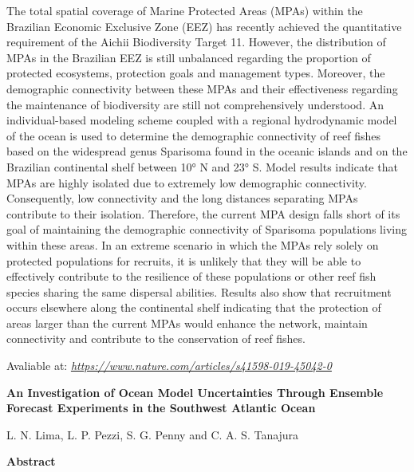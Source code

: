  The total spatial coverage of Marine Protected Areas (MPAs) within the Brazilian Economic Exclusive Zone (EEZ) has recently achieved the quantitative requirement of the Aichii 
          Biodiversity Target 11. However, the distribution of MPAs in the Brazilian EEZ is still unbalanced regarding the proportion of protected ecosystems, protection goals and management types. 
          Moreover, the demographic connectivity between these MPAs and their effectiveness regarding the maintenance of biodiversity are still not comprehensively understood. An individual-based
          modeling scheme coupled with a regional hydrodynamic model of the ocean is used to determine the demographic connectivity of reef fishes based on the widespread genus Sparisoma found in 
          the oceanic islands and on the Brazilian continental shelf between 10° N and 23° S. Model results indicate that MPAs are highly isolated due to extremely low demographic connectivity. 
          Consequently, low connectivity and the long distances separating MPAs contribute to their isolation. Therefore, the current MPA design falls short of its goal of maintaining the demographic
          connectivity of Sparisoma populations living within these areas. In an extreme scenario in which the MPAs rely solely on protected populations for recruits, it is unlikely that they will be 
          able to effectively contribute to the resilience of these populations or other reef fish species sharing the same dispersal abilities. Results also show that recruitment occurs elsewhere 
          along the continental shelf indicating that the protection of areas larger than the current MPAs would enhance the network, maintain connectivity and contribute to the conservation of reef fishes.
\bigskip

 \textcolor{black}{}
\bigskip

 Avaliable at: \textcolor{bleu_cite}{\href{https://www.nature.com/articles/s41598-019-45042-0}{\textit{https://www.nature.com/articles/s41598-019-45042-0}}}
\bigskip


\newpage
 \begin{center}
\textbf{An Investigation of Ocean Model Uncertainties Through Ensemble Forecast Experiments in the Southwest Atlantic Ocean}
\bigskip

 L. N. Lima, L. P. Pezzi, S. G. Penny and C. A. S. Tanajura
\bigskip

 \textbf{Abstract}\end{center}
\bigskip

